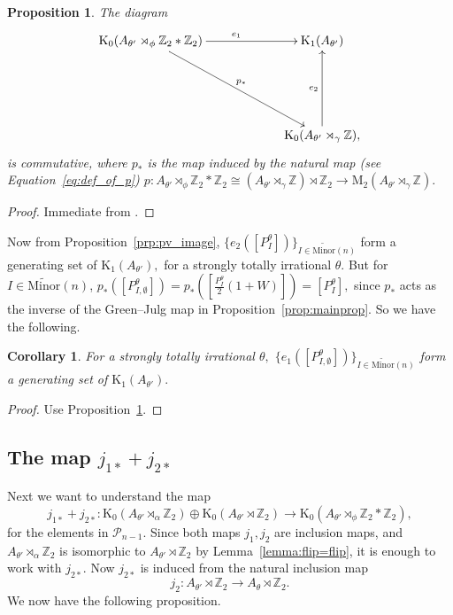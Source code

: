 \documentclass[9pt, BCOR=2mm]{amsart}
\numberwithin{equation}{section}
\numberwithin{equation}{section}
\newtheorem{proposition}[theorem]{Proposition}
\newtheorem{corollary}[theorem]{Corollary}
\newcommand{\Z}{{\mathbb{Z}}}
\newcommand{\K}{\mathrm{K}} %
\newcommand{\M}{\mathrm{M}}
\begin{document}
	\begin{proposition}\label{prop:main1}
	The diagram 
\begin{equation*}
\xymatrixrowsep{5pc}
\xymatrixcolsep{5pc}
\xymatrix
{
\K_0 (A_{\theta'}\rtimes_\phi \Z_2*\Z_2) \ar[r]^{e_1} \ar[rd]^{p_*} &
\K_1 (A_{\theta'}) \\
&\K_0(A_{\theta'}\rtimes_\gamma \Z),\ar[u]^{e_2}}
\end{equation*}
is commutative, where $p_*$ is the map induced by the natural map (see Equation~\ref{eq:def_of_p}) $p:A_{\theta'}\rtimes_\phi \Z_2 *  \Z_2 \cong (A_{\theta'}\rtimes_\gamma \Z)\rtimes\Z_2 \rightarrow \M_2(A_{\theta'}\rtimes_\gamma \Z).$ 
\end{proposition}

\begin{proof}
	Immediate from \cite[Theorem 7.1]{CL19}.
\end{proof}	
	

Now from Proposition~\ref{prp:pv_image}, $\{e_2([P_{I}^{\theta}])\}_{I\in \widetilde{\mathrm{Minor}}(n)}$ form a generating set of $\K_1(A_{\theta'}),$ for a strongly totally irrational $\theta.$  But for $I\in \widetilde{\mathrm{Minor}}(n)$, $p_*([P_{I,\emptyset}^{\theta}]) = p_*([\frac{P_{I}^{\theta}}{2}(1+W)]) = [P_{I}^{\theta}],$ since $p_*$ acts as the inverse of the Green--Julg map in Proposition~\ref{prop:mainprop}. So we have the following.

\begin{corollary}\label{cor:gen_boundary}
	For a strongly totally irrational $\theta,$ $\{e_1([P_{I,\emptyset}^{\theta}])\}_{I\in \widetilde{\mathrm{Minor}}(n)}$ form a generating set of $\K_1(A_{\theta'}).$
\end{corollary}

\begin{proof}
	Use Proposition~\ref{prop:main1}.
\end{proof}

 \subsection*{The map $j_{1*}+j_{2*}$}  
 Next we want to understand the map $$j_{1*}+j_{2*} : \K_0 (A_{\theta'}\rtimes_\alpha  \Z_2)\oplus \K_0 (A_{\theta'}\rtimes \Z_2)\longrightarrow \K_0 (A_{\theta'}\rtimes_\phi \Z_2*\Z_2),$$ for the elements in $\mathcal{P}_{n-1}.$
Since both maps $j_{1},j_{2}$ are inclusion maps, and $A_{\theta'}\rtimes_\alpha  \Z_2$ is isomorphic to $A_{\theta'}\rtimes \Z_2$ by Lemma~\ref{lemma:flip=flip}, it is enough to work with $j_{2*}.$ Now $j_{2*}$ is induced from the natural inclusion map 
$$j_{2} : A_{\theta'}\rtimes \Z_2\longrightarrow A_{\theta}\rtimes \Z_2.$$
 We now have the following proposition.
\end{document}
